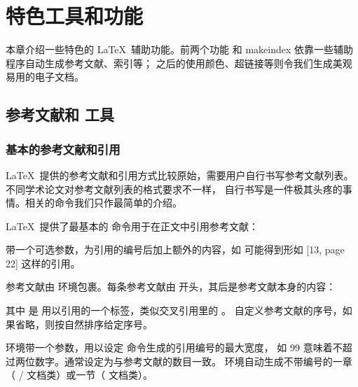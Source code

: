 \chapter{特色工具和功能}

\begin{intro}
本章介绍一些特色的 \LaTeX\ 辅助功能。前两个功能  和 makeindex 依靠一些辅助程序自动生成参考文献、索引等；
之后的使用颜色、超链接等则令我们生成美观易用的电子文档。
\end{intro}

\section{参考文献和  工具}

\subsection{基本的参考文献和引用}

\LaTeX\ 提供的参考文献和引用方式比较原始，需要用户自行书写参考文献列表。不同学术论文对参考文献列表的格式要求不一样，
自行书写是一件极其头疼的事情。相关的命令我们只作最简单的介绍。

\LaTeX\ 提供了最基本的  命令用于在正文中引用参考文献：
\begin{command}
\end{command}

 带一个可选参数，为引用的编号后加上额外的内容，如  可能得到形如 [13, page 22] 这样的引用。

参考文献由  环境包裹。每条参考文献由  开头，其后是参考文献本身的内容：
\begin{command}
\end{command}

其中  是  用以引用的一个标签，类似交叉引用里的 。
 自定义参考文献的序号，如果省略，则按自然排序给定序号。

 环境带一个参数，用以设定  命令生成的引用编号的最大宽度，
如 99 意味着不超过两位数字。通常设定为与参考文献的数目一致。
 环境自动生成不带编号的一章（ /  文档类）或一节（ 文档类）。

